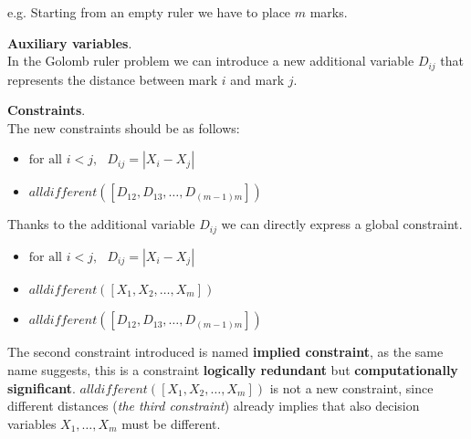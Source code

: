 \begin{example}[title = Better model]
    e.g. Starting from an empty ruler we have to place $m$ marks. \vspace{7pt}

    \textbf{Auxiliary variables}. \\ 
    In the Golomb ruler problem we can introduce a new additional variable $D_{ij}$ that represents the distance between mark $i$ and mark $j$. \vspace{7pt}

    \textbf{Constraints}. \\ 
    The new constraints should be as follows:
    \begin{itemize}
        \renewcommand{\labelitemi}{-}
        \item $\text{for all } i < j, \text{ } D_{ij} = |X_i - X_j|$
        \item $\textit{alldifferent}([D_{12}, D_{13}, \dots, D_{(m-1)m}])$
    \end{itemize}
    Thanks to the additional variable $D_{ij}$ we can directly express a global constraint.
    \begin{itemize}
        \renewcommand{\labelitemi}{-}
        \item $\text{for all } i < j, \text{ } D_{ij} = |X_i - X_j|$
        \item $\textit{alldifferent}([X_1, X_2, \dots, X_m])$
        \item $\textit{alldifferent}([D_{12}, D_{13}, \dots, D_{(m-1)m}])$
    \end{itemize}
    The second constraint introduced is named \textbf{implied constraint}, as the same name suggests, this is a constraint \textbf{logically redundant} but 
    \textbf{computationally significant}. $\textit{alldifferent}([X_1, X_2, \dots, X_m])$ is not a new constraint, since different distances (\textit{the
    third constraint}) already implies that also decision variables $X_1, \dots, X_m$ must be different.
\end{example}
